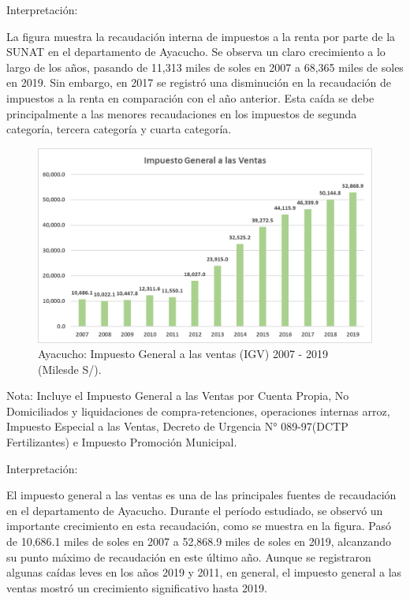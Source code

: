 \documentclass[
  letterpaper,
]{article}
\begin{document}
Interpretación:

La figura muestra la recaudación interna de impuestos a la renta por
parte de la SUNAT en el departamento de Ayacucho. Se observa un claro
crecimiento a lo largo de los años, pasando de 11,313 miles de soles en
2007 a 68,365 miles de soles en 2019. Sin embargo, en 2017 se registró
una disminución en la recaudación de impuestos a la renta en comparación
con el año anterior. Esta caída se debe principalmente a las menores
recaudaciones en los impuestos de segunda categoría, tercera categoría y
cuarta categoría.

\begin{figure}

\caption{\label{fig-2}Ayacucho: Impuesto General a las ventas (IGV) 2007
- 2019 (Milesde S/).}

{\centering \includegraphics{20230603225447.png}

}

\end{figure}

Nota: Incluye el Impuesto General a las Ventas por Cuenta Propia, No
Domiciliados y liquidaciones de compra-retenciones, operaciones internas
arroz, Impuesto Especial a las Ventas, Decreto de Urgencia N°
089-97(DCTP Fertilizantes) e Impuesto Promoción Municipal.

Interpretación:

El impuesto general a las ventas es una de las principales fuentes de
recaudación en el departamento de Ayacucho. Durante el período
estudiado, se observó un importante crecimiento en esta recaudación,
como se muestra en la figura. Pasó de 10,686.1 miles de soles en 2007 a
52,868.9 miles de soles en 2019, alcanzando su punto máximo de
recaudación en este último año. Aunque se registraron algunas caídas
leves en los años 2019 y 2011, en general, el impuesto general a las
ventas mostró un crecimiento significativo hasta 2019.
\end{document}
